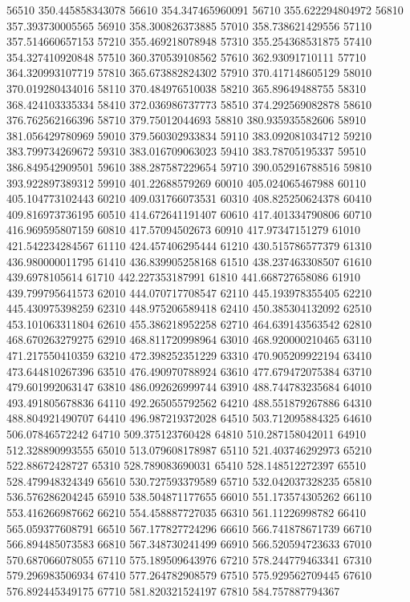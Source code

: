 {56510 350.445858343078
56610 354.347465960091
56710 355.622294804972
56810 357.393730005565
56910 358.300826373885
57010 358.738621429556
57110 357.514660657153
57210 355.469218078948
57310 355.254368531875
57410 354.327410920848
57510 360.370539108562
57610 362.93091710111
57710 364.320993107719
57810 365.673882824302
57910 370.417148605129
58010 370.019280434016
58110 370.484976510038
58210 365.89649488755
58310 368.424103335334
58410 372.036986737773
58510 374.292569082878
58610 376.762562166396
58710 379.75012044693
58810 380.935935582606
58910 381.056429780969
59010 379.560302933834
59110 383.092081034712
59210 383.799734269672
59310 383.016709063023
59410 383.78705195337
59510 386.849542909501
59610 388.287587229654
59710 390.052916788516
59810 393.922897389312
59910 401.22688579269
60010 405.024065467988
60110 405.104773102443
60210 409.031766073531
60310 408.825250624378
60410 409.816973736195
60510 414.672641191407
60610 417.401334790806
60710 416.969595807159
60810 417.57094502673
60910 417.97347151279
61010 421.542234284567
61110 424.457406295444
61210 430.515786577379
61310 436.980000011795
61410 436.839905258168
61510 438.237463308507
61610 439.6978105614
61710 442.227353187991
61810 441.668727658086
61910 439.799795641573
62010 444.070717708547
62110 445.193978355405
62210 445.430975398259
62310 448.975206589418
62410 450.385304132092
62510 453.101063311804
62610 455.386218952258
62710 464.639143563542
62810 468.670263279275
62910 468.811720998964
63010 468.920000210465
63110 471.217550410359
63210 472.398252351229
63310 470.905209922194
63410 473.644810267396
63510 476.490970788924
63610 477.679472075384
63710 479.601992063147
63810 486.092626999744
63910 488.744783235684
64010 493.491805678836
64110 492.265055792562
64210 488.551879267886
64310 488.804921490707
64410 496.987219372028
64510 503.712095884325
64610 506.07846572242
64710 509.375123760428
64810 510.287158042011
64910 512.328890993555
65010 513.079608178987
65110 521.403746292973
65210 522.88672428727
65310 528.789083690031
65410 528.148512272397
65510 528.479948324349
65610 530.727593379589
65710 532.042037328235
65810 536.576286204245
65910 538.504871177655
66010 551.173574305262
66110 553.416266987662
66210 554.458887727035
66310 561.11226998782
66410 565.059377608791
66510 567.177827724296
66610 566.741878671739
66710 566.894485073583
66810 567.348730241499
66910 566.520594723633
67010 570.687066078055
67110 575.189509643976
67210 578.244779463341
67310 579.296983506934
67410 577.264782908579
67510 575.929562709445
67610 576.892445349175
67710 581.820321524197
67810 584.757887794367
}
